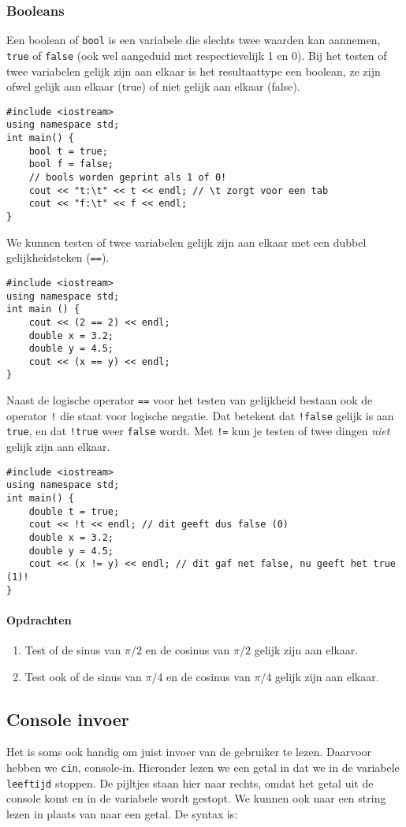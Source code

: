 \documentclass[12pt,a4paper]{article}
\newcommand{\icode}{\lstinline}
\begin{document}
\subsubsection{Booleans}
Een boolean of \icode{bool} is een variabele die slechts twee waarden kan aannemen, \icode{true} of 
\icode{false} (ook wel aangeduid met respectievelijk 1 en 0). Bij het testen of twee variabelen gelijk 
zijn aan elkaar is het resultaattype een boolean, ze zijn ofwel gelijk aan elkaar (true) of niet gelijk aan 
elkaar (false).
\begin{lstlisting}
#include <iostream> 
using namespace std; 
int main() {
	bool t = true;
	bool f = false; 
	// bools worden geprint als 1 of 0! 
	cout << "t:\t" << t << endl; // \t zorgt voor een tab
	cout << "f:\t" << f << endl; 
}
\end{lstlisting}

We kunnen testen of twee variabelen gelijk zijn aan elkaar met een dubbel gelijkheidsteken (\icode{==}). 
\begin{lstlisting}
#include <iostream> 
using namespace std;
int main () {
	cout << (2 == 2) << endl; 
	double x = 3.2; 
	double y = 4.5; 
	cout << (x == y) << endl; 
}
\end{lstlisting}
Naast de logische operator \icode{==} voor het testen van gelijkheid bestaan ook de operator \icode{!} die staat voor 
logische negatie. Dat betekent dat \icode{!false} gelijk is aan \icode{true}, en dat \icode{!true} weer \icode{false} wordt.
Met \icode{!=} kun je testen of twee dingen \emph{niet} gelijk zijn aan elkaar. 
\begin{lstlisting}
#include <iostream> 
using namespace std; 
int main() {
	double t = true; 
	cout << !t << endl; // dit geeft dus false (0) 
	double x = 3.2; 
	double y = 4.5; 
	cout << (x != y) << endl; // dit gaf net false, nu geeft het true (1)! 
}
\end{lstlisting}
\paragraph{Opdrachten} 
\begin{enumerate}
\item 
Test of de sinus van $\pi/2$ en de cosinus van $\pi/2$ gelijk zijn aan elkaar.
\item
Test ook of de sinus van $\pi/4$ en de cosinus van $\pi/4$ gelijk zijn aan elkaar.
\end{enumerate} 
\subsection{Console invoer}
Het is soms ook handig om juist invoer van de gebruiker te lezen. Daarvoor hebben we \icode{cin}, console-in. Hieronder lezen we een getal in dat we in de variabele \icode{leeftijd} stoppen. De pijltjes staan hier naar rechts, omdat het getal uit de console komt en in de variabele wordt gestopt. We kunnen ook naar een string lezen in plaats van naar een getal. De syntax is: \\
\end{document}

